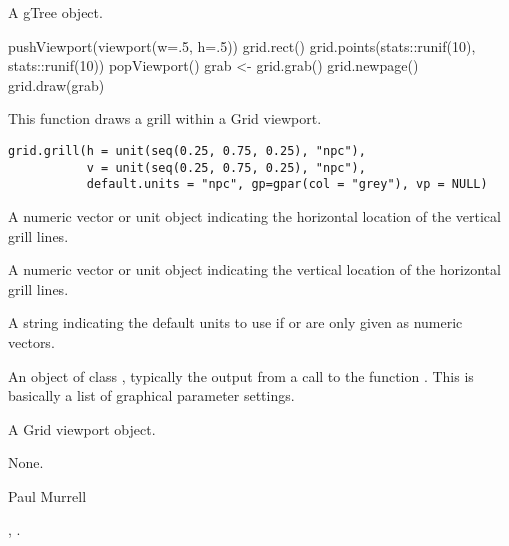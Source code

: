 %
\begin{Value}
A gTree object.
\end{Value}
%
\begin{SeeAlso}\relax
\end{SeeAlso}
%
\begin{Examples}
\begin{ExampleCode}
pushViewport(viewport(w=.5, h=.5))
grid.rect()
grid.points(stats::runif(10), stats::runif(10))
popViewport()
grab <- grid.grab()
grid.newpage()
grid.draw(grab)
\end{ExampleCode}
\end{Examples}
%
\begin{Description}\relax
This function draws a grill within a Grid viewport.
\end{Description}
%
\begin{Usage}
\begin{verbatim}
grid.grill(h = unit(seq(0.25, 0.75, 0.25), "npc"),
           v = unit(seq(0.25, 0.75, 0.25), "npc"),
           default.units = "npc", gp=gpar(col = "grey"), vp = NULL)
\end{verbatim}
\end{Usage}
%
\begin{Arguments}
\begin{ldescription}
\item[\code{h}] A numeric vector or unit object
indicating the horizontal location of the
vertical grill lines.
\item[\code{v}] A numeric vector or unit object
indicating the vertical location of the
horizontal grill lines.
\item[\code{default.units}] A string indicating the default units to use
if  or  are only given as numeric vectors.
\item[\code{gp}] An object of class , typically the output
from a call to the function .  This is basically
a list of graphical parameter settings.
\item[\code{vp}] A Grid viewport object.
\end{ldescription}
\end{Arguments}
%
\begin{Value}
None.
\end{Value}
%
\begin{Author}\relax
Paul Murrell
\end{Author}
%
\begin{SeeAlso}\relax
{},
.
\end{SeeAlso}
